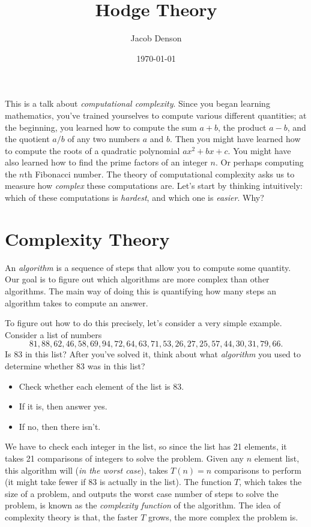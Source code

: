 \documentclass{article}
\title{Hodge Theory}
\author{Jacob Denson}
\date{\today}
\theoremstyle{plain}
\theoremstyle{remark}
\theoremstyle{definition}
\begin{document}
\maketitle

This is a talk about \emph{computational complexity}. Since you began learning mathematics, you've trained yourselves to compute various different quantities; at the beginning, you learned how to compute the sum $a + b$, the product $a - b$, and the quotient $a / b$ of any two numbers $a$ and $b$. Then you might have learned how to compute the roots of a quadratic polynomial $ax^2 + bx + c$. You might have also learned how to find the prime factors of an integer $n$. Or perhaps computing the $n$th Fibonacci number. The theory of computational complexity asks us to measure how \emph{complex} these computations are. Let's start by thinking intuitively: which of these computations is \emph{hardest}, and which one is \emph{easier}. Why?

\section{Complexity Theory}

An \emph{algorithm} is a sequence of steps that allow you to compute some quantity. Our goal is to figure out which algorithms are more complex than other algorithms. The main way of doing this is quantifying how many steps an algorithm takes to compute an answer.

To figure out how to do this precisely, let's consider a very simple example. Consider a list of numbers
%
\[  81, 88, 62, 46, 58, 69, 94, 72, 64, 63, 71, 53, 26, 27, 25, 57, 44, 30, 31, 79, 66. \]
%
Is $83$ in this list? After you've solved it, think about what \emph{algorithm} you used to determine whether $83$ was in this list?
%
\begin{itemize}
    \item Check whether each element of the list is $83$.
    \item If it is, then answer yes.
    \item If no, then there isn't.
\end{itemize}
%
We have to check each integer in the list, so since the list has 21 elements, it takes 21 comparisons of integers to solve the problem. Given any $n$ element list, this algorithm will (\emph{in the worst case}), takes $T(n) = n$ comparisons to perform (it might take fewer if $83$ is actually in the list). The function $T$, which takes the size of a problem, and outputs the worst case number of steps to solve the problem, is known as the \emph{complexity function} of the algorithm. The idea of complexity theory is that, the faster $T$ grows, the more complex the problem is.
\end{document}

